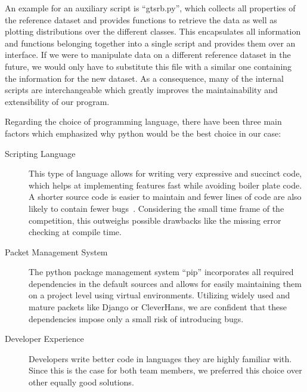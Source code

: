 An example for an auxiliary script is \enquote{gtsrb.py}, which collects all properties of the reference dataset and provides functions to retrieve the data as well as plotting distributions over the different classes.
This encapsulates all information and functions belonging together into a single script and provides them over an interface.
If we were to manipulate data on a different reference dataset in the future, we would only have to substitute this file with a similar one containing the information for the new dataset.
As a consequence, many of the internal scripts are interchangeable which greatly improves the maintainability and extensibility of our program.

Regarding the choice of programming language, there have been three main factors which emphasized why python would be the best choice in our case:
\begin{description}
	\item[Scripting Language] This type of language allows for writing very expressive and succinct code, which helps at implementing features fast while avoiding boiler plate code. 
	A shorter source code is easier to maintain and fewer lines of code are also likely to contain fewer bugs~\cite{jain2017clairvoyant}. 
	Considering the small time frame of the competition, this outweighs possible drawbacks like the missing error checking at compile time.
	\item[Packet Management System] The python package management system \enquote{pip} incorporates all required dependencies in the default sources and allows for easily maintaining them on a project level using virtual environments. 
	Utilizing widely used  and mature packets like Django or CleverHans, we are confident that these dependencies impose only a small risk of introducing bugs.
	\item[Developer Experience] Developers write better code in languages they are highly familiar with.
	Since this is the case for both team members, we preferred this choice over other equally good solutions.
\end{description}


